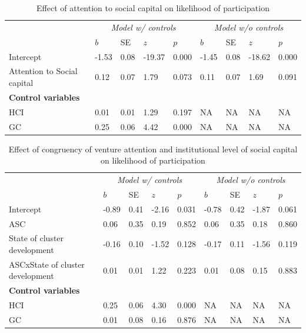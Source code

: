 \documentclass[
  english,
  man]{apa6}
\begin{document}
\begin{table}

\caption{\label{tab:unnamed-chunk-18}Effect of attention to social capital on likelihood of participation}
\centering
\begin{tabular}[t]{l|l|l|l|l|l|l|l|l}
\hline
\multicolumn{1}{c|}{\em{ }} & \multicolumn{4}{c|}{\em{Model w/ controls}} & \multicolumn{4}{c}{\em{Model w/o controls}} \\
\cline{2-5} \cline{6-9}
  & $b$ & SE & $z$ & $p$ & $b$ & SE & $z$ & $p$\\
\hline
Intercept & -1.53 & 0.08 & -19.37 & 0.000 & -1.45 & 0.08 & -18.62 & 0.000\\
\hline
Attention to Social capital & 0.12 & 0.07 & 1.79 & 0.073 & 0.11 & 0.07 & 1.69 & 0.091\\
\hline
\multicolumn{9}{l}{\textbf{Control variables}}\\
\hline
\hspace{1em}HCI & 0.01 & 0.01 & 1.29 & 0.197 & NA & NA & NA & NA\\
\hline
\hspace{1em}GC & 0.25 & 0.06 & 4.42 & 0.000 & NA & NA & NA & NA\\
\hline
\end{tabular}
\end{table}

\begin{table}

\caption{\label{tab:unnamed-chunk-18}Effect of congruency of venture attention and institutional level of social capital on likelihood of participation}
\centering
\begin{tabular}[t]{l|l|l|l|l|l|l|l|l}
\hline
\multicolumn{1}{c|}{\em{ }} & \multicolumn{4}{c|}{\em{Model w/ controls}} & \multicolumn{4}{c}{\em{Model w/o controls}} \\
\cline{2-5} \cline{6-9}
  & $b$ & SE & $z$ & $p$ & $b$ & SE & $z$ & $p$\\
\hline
Intercept & -0.89 & 0.41 & -2.16 & 0.031 & -0.78 & 0.42 & -1.87 & 0.061\\
\hline
ASC & 0.06 & 0.35 & 0.19 & 0.852 & 0.06 & 0.35 & 0.18 & 0.860\\
\hline
State of cluster development & -0.16 & 0.10 & -1.52 & 0.128 & -0.17 & 0.11 & -1.56 & 0.119\\
\hline
ASCxState of cluster development & 0.01 & 0.01 & 1.22 & 0.223 & 0.01 & 0.08 & 0.15 & 0.883\\
\hline
\multicolumn{9}{l}{\textbf{Control variables}}\\
\hline
\hspace{1em}HCI & 0.25 & 0.06 & 4.30 & 0.000 & NA & NA & NA & NA\\
\hline
\hspace{1em}GC & 0.01 & 0.08 & 0.16 & 0.876 & NA & NA & NA & NA\\
\hline
\end{tabular}
\end{table}
\end{document}
